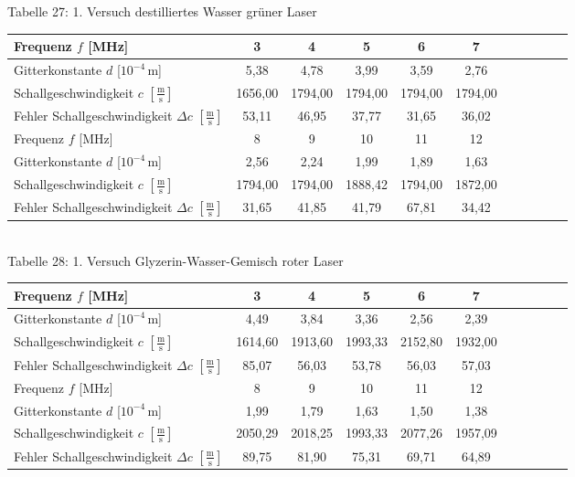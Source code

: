\documentclass[fontsize=12pt]{scrartcl}
\begin{document}
~\\
~\\ 
Tabelle 27: 1. Versuch destilliertes Wasser grüner Laser \\
\begin{tabular}{|l|c|c|c|c|c|c|c|c|c|c|} \hline
Frequenz $f$ [MHz] & 3 & 4 & 5 & 6 & 7 \\ \hline
Gitterkonstante $d$ [$10^{-4}$\,m] & 5,38 & 4,78 & 3,99 & 3,59 & 2,76  \\ \hline
Schallgeschwindigkeit $c$ $[\frac{{\text{m}}}{{\text{s}}}]$ & 1656,00 & 1794,00 & 1794,00 & 1794,00 & 1794,00 \\ \hline
Fehler Schallgeschwindigkeit $\Delta c$ $[\frac{{\text{m}}}{{\text{s}}}]$ & 53,11 & 
46,95 & 
37,77 & 
31,65 & 
36,02 
 \\ \hline
Frequenz $f$ [MHz] & 8 & 9 & 10 & 11 & 12\\ \hline
Gitterkonstante $d$ [$10^{-4}$\,m] & 2,56 & 2,24 & 1,99 &  1,89  & 1,63  \\ \hline
Schallgeschwindigkeit $c$ $[\frac{{\text{m}}}{{\text{s}}}]$ & 1794,00 &1794,00 & 1888,42 & 1794,00 & 1872,00 \\ \hline
Fehler Schallgeschwindigkeit $\Delta c$ $[\frac{{\text{m}}}{{\text{s}}}]$ & 
31,65 & 
41,85 & 
41,79 & 
67,81 & 
34,42  \\ \hline
\end{tabular} \\

\newpage
\noindent
Tabelle 28: 1. Versuch Glyzerin-Wasser-Gemisch roter Laser \\
\begin{tabular}{|l|c|c|c|c|c|c|c|c|c|c|} \hline
Frequenz $f$ [MHz] & 3 & 4 & 5 & 6 & 7 \\ \hline
Gitterkonstante $d$ [$10^{-4}$\,m] & 4,49 & 3,84 & 3,36 & 2,56 & 2,39  \\ \hline
Schallgeschwindigkeit $c$ $[\frac{{\text{m}}}{{\text{s}}}]$ & 1614,60 & 1913,60 & 1993,33 & 2152,80 & 1932,00    \\ \hline
Fehler Schallgeschwindigkeit $\Delta c$ $[\frac{{\text{m}}}{{\text{s}}}]$ & 85,07 & 
56,03 & 
53,78 & 
56,03 & 
57,03 
  \\ \hline
Frequenz $f$ [MHz] & 8 & 9 & 10 & 11 & 12\\ \hline
Gitterkonstante $d$ [$10^{-4}$\,m] & 1,99 & 1,79 & 1,63 & 1,50 & 1,38 \\ \hline
Schallgeschwindigkeit $c$ $[\frac{{\text{m}}}{{\text{s}}}]$ &  2050,29 & 2018,25 & 1993,33 & 2077,26 & 1957,09 \\ \hline
Fehler Schallgeschwindigkeit $\Delta c$ $[\frac{{\text{m}}}{{\text{s}}}]$ & 
89,75 & 
81,90 & 
75,31 & 
69,71 & 
64,89  \\ \hline
\end{tabular} \\
\end{document}
